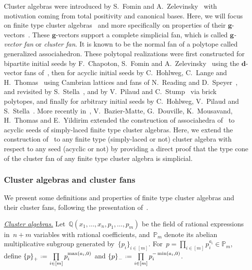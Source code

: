 \documentclass{amsart}
\theoremstyle{definition}
\newcommand{\Q}{\mathbb{Q}} %
\renewcommand{\b}[1]{{\boldsymbol{#1}}} %
\newcommand{\eqdef}{\mbox{\,\raisebox{0.2ex}{\scriptsize\ensuremath{\mathrm:}}\ensuremath{=}\,}} %
\newcommand{\darkblue}{\color{darkblue}} %
\newcommand{\defn}[1]{\textsl{\darkblue #1}} %
\newcommand{\para}[1]{\medskip\noindent\uline{\textit{#1.}}} %
\newcommand{\Trop}[1]{\mathbb{P}_{#1}} %
\newcommand{\positiveExponents}[1]{\left\{#1\right\}_+} %
\newcommand{\negativeExponents}[1]{\left\{#1\right\}_-} %
\begin{document}
Cluster algebras were introduced by S.~Fomin and A.~Zelevinsky~\cite{FominZelevinsky-ClusterAlgebrasI} with motivation coming from total positivity and canonical bases.
Here, we will focus on finite type cluster algebras~\cite{FominZelevinsky-ClusterAlgebrasII} and more specifically on properties of their $\b{g}$-vectors~\cite{FominZelevinsky-ClusterAlgebrasIV}.
These $\b{g}$-vectors support a complete simplicial fan, which is called \defn{$\b{g}$-vector fan} or \defn{cluster fan}. It is known to be the normal fan of a polytope called generalized associahedron. These polytopal realizations were first constructed for bipartite initial seeds by F.~Chapoton, S.~Fomin and A.~Zelevinsky~\cite{ChapotonFominZelevinsky} using the $\b{d}$-vector fans of~\cite{FominZelevinsky-YSystems}, then for acyclic initial seeds by C.~Hohlweg, C.~Lange and H.~Thomas~\cite{HohlwegLangeThomas} using Cambrian lattices and fans of N.~Reading and D.~Speyer~\cite{Reading-CambrianLattices, ReadingSpeyer}, and revisited by S.~Stella~\cite{Stella}, and by V.~Pilaud and C.~Stump~\cite{PilaudStump-brickPolytope} via brick polytopes, and finally for arbitrary initial seeds by C.~Hohlweg, V.~Pilaud and S.~Stella~\cite{HohlwegPilaudStella}.
More recently in~\cite{BazierMatteDouvilleMousavandThomasYildirim}, V.~Bazier-Matte, G.~Douville, K.~Mousavand, H.~Thomas and E.~Yildirim extended the construction of associahedra of~\cite[Sect.~3.2]{ArkaniHamedBaiHeYan} to acyclic seeds of simply-laced finite type cluster algebras.
Here, we extend the construction of~\cite[Sect.~3.2]{ArkaniHamedBaiHeYan} to any finite type (simply-laced or not) cluster algebra with respect to any seed (acyclic or not) by providing a direct proof that the type cone of the cluster fan of any finite type cluster algebra is simplicial.

\subsubsection{Cluster algebras and cluster fans}

We present some definitions and properties of finite type cluster algebras and their cluster fans, following the presentation of~\cite{HohlwegPilaudStella}.

\para{Cluster algebras}
%
Let~$\Q(x_1, \dots, x_n, p_1, \dots, p_m)$ be the field of rational expressions in~$n+m$ variables with rational coefficients, and~$\Trop{m}$ denote its abelian multiplicative subgroup generated by~$\{p_i\}_{i \in [m]}$.
For~$p = \prod\limits_{i \in [m]} p_i^{a_i} \in \Trop{m}$, define
\(
\positiveExponents{p} \eqdef \prod\limits_{i \in [m]} p_i^{\max(a_i,0)}
\)
and
\(
\negativeExponents{p} \eqdef \prod\limits_{i \in [m]} p_i^{-\min(a_i,0)}
\).
\end{document}

